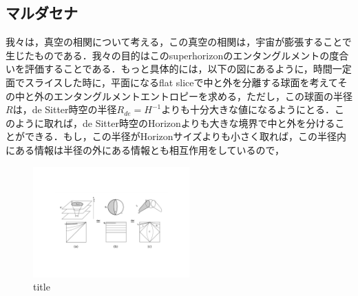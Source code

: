 \subsection{マルダセナ}
我々は，真空の相関について考える，この真空の相関は，宇宙が膨張することで生じたものである．我々の目的はこのsuperhorizonのエンタングルメントの度合いを評価することである．もっと具体的には，以下の図にあるように，時間一定面でスライスした時に，平面になるflat sliceで中と外を分離する球面を考えてその中と外のエンタングルメントエントロピーを求める，ただし，この球面の半径$R$は，de Sitter時空の半径$R_{de}=H^{-1}$よりも十分大きな値になるようにとる．このように取れば，de Sitter時空のHorizonよりも大きな境界で中と外を分けることができる．もし，この半径がHorizonサイズよりも小さく取れば，この半径内にある情報は半径の外にある情報とも相互作用をしているので，
  \begin{figure}[H]
    \begin{center}
    \includegraphics[width=6cm,angle=270]{de.pdf}
    \caption{title}
    \end{center}
  \end{figure}

